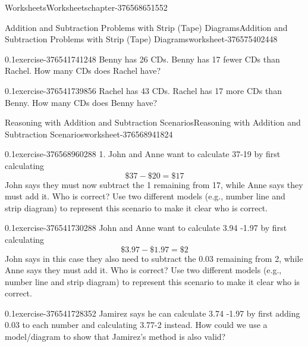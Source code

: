 \documentclass[twoside,11pt,]{book}
\begin{document}
\begin{chapterptx}{Worksheets}{}{Worksheets}{}{}{chapter-376568651552}
\begin{worksheet-section-numberless}{Addition and Subtraction Problems with Strip (Tape) Diagrams}{}{Addition and Subtraction Problems with Strip (Tape) Diagrams}{}{}{worksheet-376575402448}
\begin{divisionexercise}{6}{}{0.1}{exercise-376541741248}
Benny has 26 CDs. Benny has 17 fewer CDs than Rachel.  How many CDs does Rachel have?%
\end{divisionexercise}%
\begin{divisionexercise}{7}{}{0.1}{exercise-376541739856}%
\hypertarget{p-376541739120}{}%
Rachel has 43 CDs. Rachel has 17 more CDs than Benny.  How many CDs does Benny have?%
\end{divisionexercise}%
\end{worksheet-section-numberless}
\restoregeometry
%
%
\typeout{************************************************}
\typeout{************************************************}
%
\begin{worksheet-section-numberless}{Reasoning with Addition and Subtraction Scenarios}{}{Reasoning with Addition and Subtraction Scenarios}{}{}{worksheet-376568941824}
\begin{divisionexercise}{1}{}{0.1}{exercise-376568960288}%
\hypertarget{p-376541731568}{}%
1.	John and Anne want to calculate \textdollar{}37-\textdollar{}19 by first calculating%
\begin{equation*}
\$37-\$20=\$17 
\end{equation*}
John says they must now subtract the \textdollar{}1 remaining from \textdollar{}17, while Anne says they must add it.  Who is correct?  Use two different models (e.g., number line and strip diagram) to represent this scenario to make it clear who is correct.%
\end{divisionexercise}%
\begin{divisionexercise}{2}{}{0.1}{exercise-376541730288}%
\hypertarget{p-376541729648}{}%
John and Anne want to calculate \textdollar{}3.94 -\textdollar{}1.97 by first calculating%
\begin{equation*}
\$3.97-\$1.97 = \$2 
\end{equation*}
John says in this case they also need to subtract the \textdollar{}0.03 remaining from \textdollar{}2, while Anne says they must add it.  Who is correct?  Use two different models (e.g., number line and strip diagram) to represent this scenario to make it clear who is correct.%
\end{divisionexercise}%
\begin{divisionexercise}{3}{}{0.1}{exercise-376541728352}%
\hypertarget{p-376541727616}{}%
Jamirez says he can calculate \textdollar{}3.74 -\textdollar{}1.97 by first adding \textdollar{}0.03 to each number and calculating \textdollar{}3.77-\textdollar{}2 instead.  How could we use a model\slash{}diagram to show that Jamirez’s method is also valid?%

\end{divisionexercise}
\end{worksheet-section-numberless}
\end{chapterptx}
\end{document}
